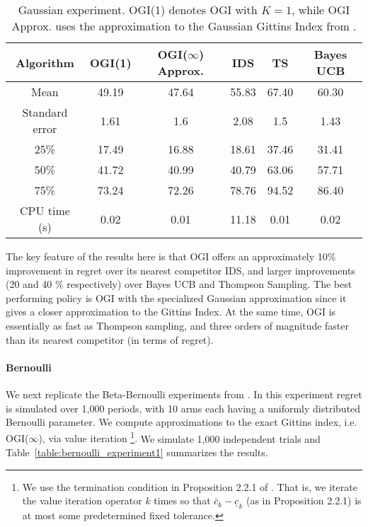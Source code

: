 \begin{table}[h!]
	\centering
	\begin{tabular}{cccccc} \toprule
		\textbf{Algorithm}  & \textbf{OGI(1)} & \textbf{OGI($\infty$) Approx.} & \textbf{IDS} & \textbf{TS} & \textbf{Bayes UCB}\\ \midrule
		Mean   & 49.19 & 47.64  &  55.83 & 67.40 & 60.30  \\ 
		Standard error  & 1.61 & 1.6 & 2.08 & 1.5 & 1.43 \\ 
		25\%  & 17.49 & 16.88  & 18.61 & 37.46 & 31.41 \\
		50\%   & 41.72 & 40.99 & 40.79 & 63.06 & 57.71 \\ 
		75\%  & 73.24 & 72.26 & 78.76 & 94.52 & 86.40 \\ 
		CPU time (s) & 0.02 & 0.01 & 11.18 & 0.01 & 0.02 \\
		\bottomrule
	\end{tabular}
	\caption[Table caption text]{Gaussian experiment. OGI(1) denotes OGI with $K =1$, while OGI Approx. uses the approximation to the Gaussian Gittins Index from \cite{powell2012optimal}.}
	\label{table:gaussian_experiment1}
\end{table}

The key feature of the results here is that OGI offers an approximately 10\% improvement in regret over its nearest competitor IDS, and larger improvements (20 and 40 \% respectively) over Bayes UCB and Thompson Sampling. The best performing policy is OGI with the specialized Gaussian approximation since it gives a closer approximation to the Gittins Index. At the same time, OGI is essentially as fast as Thompson sampling, and three orders of magnitude faster than its nearest competitor (in terms of regret). 


\paragraph{Bernoulli}
We next replicate the Beta-Bernoulli experiments from \cite{russo2014learning}.
In this experiment regret is simulated over 1,000 periods, with 10 arms each having a uniformly distributed Bernoulli parameter. 
{\color{blue} 
We compute approximations to the exact Gittins index, i.e. OGI($\infty$), via value iteration \footnote{
We use the termination condition in Proposition 2.2.1 of \cite{bertsekas2011dynamic}. That is, we iterate the value iteration operator $k$ times so that $\bar{c}_k - \underline{c}_k$ (as in Proposition 2.2.1) is at most some predetermined fixed tolerance.
}.
}
We simulate 1,000 independent trials and Table~\ref{table:bernoulli_experiment1} summarizes the results.

